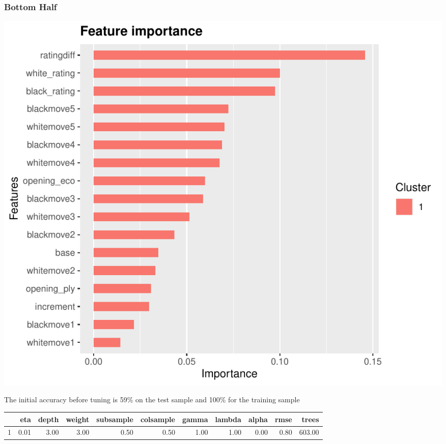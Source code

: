 \documentclass[12pt,preprint, authoryear]{elsarticle}
\let\origfigure\figure
\let\endorigfigure\endfigure
\renewenvironment{figure}[1][2] {
    \expandafter\origfigure\expandafter[H]
} {
    \endorigfigure
}
\let\origtable\table
\let\endorigtable\endtable
\renewenvironment{table}[1][2] {
    \expandafter\origtable\expandafter[H]
} {
    \endorigtable
}
\numberwithin{equation}{section}
\numberwithin{figure}{section}
\numberwithin{table}{section}
\begin{document}
\hypertarget{bottom-half}{%
\subsubsection{Bottom Half}\label{bottom-half}}

\begin{figure}[H]

{\centering \includegraphics{WriteUp_files/figure-latex/importancelow1-1} 

}

\caption{Feature Importance Untuned Model: Bottom Half\label{Figure11}}\label{fig:importancelow1}
\end{figure}

The initial accuracy before tuning is 59\% on the test sample and 100\%
for the training sample

\begin{table}[H]
\centering
\begin{tabular}{rrrrrrrrrrr}
  \hline
 & eta & depth & weight & subsample & colsample& gamma & lambda & alpha & rmse & trees \\ 
  \hline
1 & 0.01 & 3.00 & 3.00 & 0.50 & 0.50 & 1.00 & 1.00 & 0.00 & 0.80 & 603.00 \\ 

   \hline
\end{tabular}
\caption{Hypergrid Bottom Half} 
\end{table}
\end{document}
